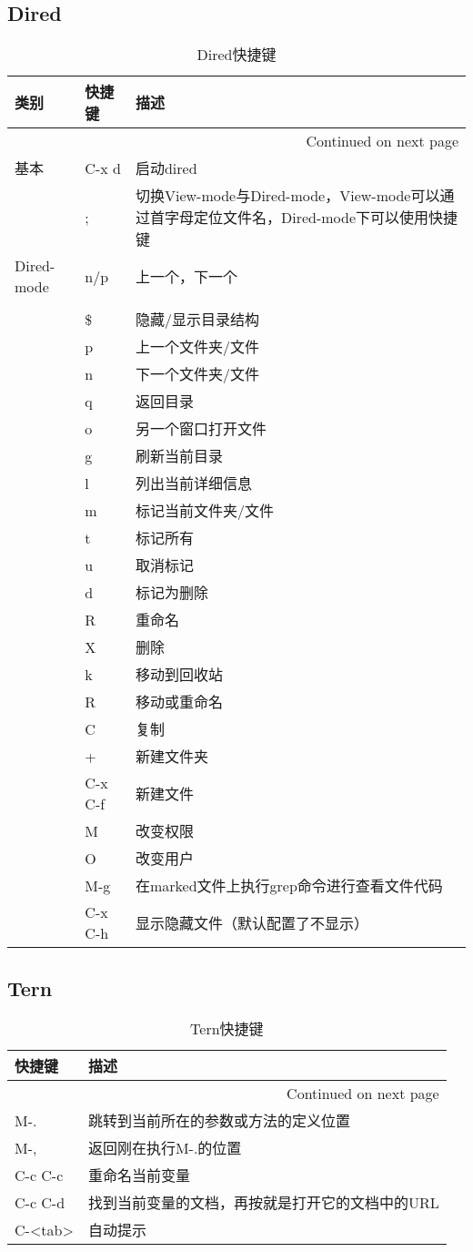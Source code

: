 \documentclass[10pt,a4paper]{article}
\begin{document}
\subsection{Dired}
\label{sec-3-4}
\begin{longtable}{l|l|l}
\caption{Dired快捷键}
\\
类别 & 快捷键 & 描述\\
\hline
\endhead
\hline\multicolumn{3}{r}{Continued on next page} \\
\endfoot
\endlastfoot
基本 & C-x d & 启动dired\\
 & ; & 切换View-mode与Dired-mode，View-mode可以通过首字母定位文件名，Dired-mode下可以使用快捷键\\
\hline
Dired-mode & n/p & 上一个，下一个\\
 &  & \\
 & \$ & 隐藏/显示目录结构\\
 & p & 上一个文件夹/文件\\
 & n & 下一个文件夹/文件\\
 & q & 返回目录\\
 & o & 另一个窗口打开文件\\
 & g & 刷新当前目录\\
 & l & 列出当前详细信息\\
\hline
 & m & 标记当前文件夹/文件\\
 & t & 标记所有\\
 & u & 取消标记\\
 & d & 标记为删除\\
 & R & 重命名\\
\hline
 & X & 删除\\
 & k & 移动到回收站\\
 & R & 移动或重命名\\
 & C & 复制\\
 & + & 新建文件夹\\
 & C-x C-f & 新建文件\\
\hline
 & M & 改变权限\\
 & O & 改变用户\\
\hline
 & M-g & 在marked文件上执行grep命令进行查看文件代码\\
 & C-x C-h & 显示隐藏文件（默认配置了不显示）\\
\end{longtable}
\subsection{Tern}
\label{sec-3-5}


\begin{longtable}{l|l}
\caption{Tern快捷键}
\\
快捷键 & 描述\\
\hline
\endhead
\hline\multicolumn{2}{r}{Continued on next page} \\
\endfoot
\endlastfoot
M-. & 跳转到当前所在的参数或方法的定义位置\\
M-, & 返回刚在执行M-.的位置\\
C-c C-c & 重命名当前变量\\
C-c C-d & 找到当前变量的文档，再按就是打开它的文档中的URL\\
C-<tab> & 自动提示\\
\end{longtable}
\end{document}
